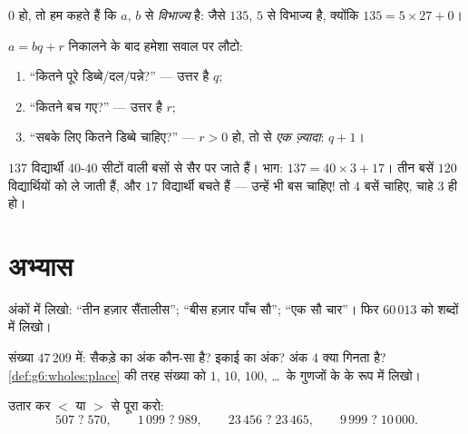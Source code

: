 \begin{definition}[विभाज्य]\label{def:g6:wholes:divisible}
 $0$ हो, तो हम कहते हैं कि $a$, $b$ से
\emph{विभाज्य} है: जैसे $135$, $5$ से विभाज्य
है, क्योंकि $135 = 5 \times 27 + 0$।
\end{definition}

\begin{method}[भाग वाली शब्द-समस्याएँ]\label{met:g6:wholes:problems}
$a = bq + r$ निकालने के बाद हमेशा सवाल पर लौटो:
\begin{enumerate}
  \item ``कितने पूरे डिब्बे/दल/पन्ने?'' --- उत्तर है 
        $q$;
  \item ``कितने बच गए?'' --- उत्तर है 
        $r$;
  \item ``सबके लिए कितने डिब्बे चाहिए?'' --- $r > 0$ हो, तो
         से \emph{एक ज़्यादा}: $q + 1$।
\end{enumerate}
\end{method}

\begin{example}\label{ex:g6:wholes:bus}
$137$ विद्यार्थी $40$-$40$ सीटों वाली बसों से सैर पर जाते हैं।
भाग: $137 = 40 \times 3 + 17$। तीन बसें $120$ विद्यार्थियों को
ले जाती हैं, और $17$ विद्यार्थी बचते हैं --- उन्हें भी बस
चाहिए! तो $4$ बसें चाहिए, चाहे  $3$ ही हो।
\end{example}

\section{अभ्यास}

\begin{exercise}[$\star$]\label{exo:g6:wholes:1}
अंकों में लिखो: ``तीन हज़ार सैंतालीस''; ``बीस हज़ार
पाँच सौ''; ``एक सौ चार''। फिर $60\,013$ को शब्दों में लिखो।
\end{exercise}

\begin{exercise}[$\star$]\label{exo:g6:wholes:2}
संख्या $47\,209$ में: सैकड़े का अंक कौन-सा है? इकाई का अंक?
अंक $4$ क्या गिनता है? \cref{def:g6:wholes:place} की तरह संख्या
को $1$, $10$, $100$, \dots\ के गुणजों के  के रूप में
लिखो।
\end{exercise}

\begin{exercise}[$\star$]\label{exo:g6:wholes:3}
उतार कर $<$ या $>$ से पूरा करो:
\[
507 \;?\; 570, \qquad
1\,099 \;?\; 989, \qquad
23\,456 \;?\; 23\,465, \qquad
9\,999 \;?\; 10\,000 .
\]
\end{exercise}

